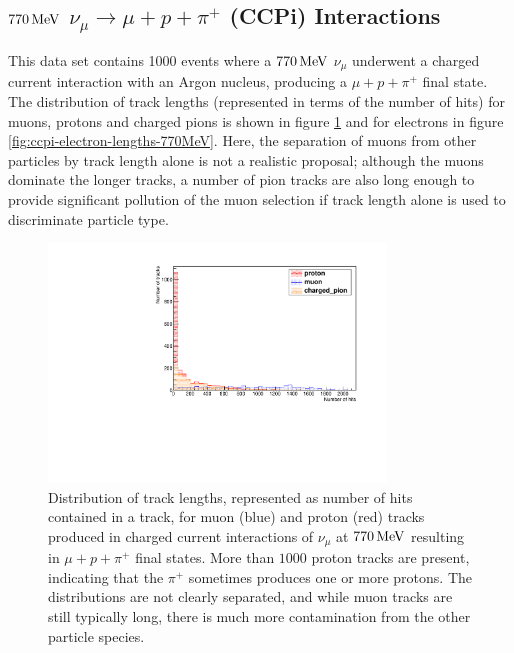 \subsection{$770\MeV$ $\nu_\mu \rightarrow \mu + p + \pi^+$ (CCPi) Interactions}
This data set contains 1000 events where a $770\MeV$ $\nu_\mu$ underwent a charged current interaction with an Argon nucleus, producing a $\mu + p + \pi^+$ final state. The distribution of track lengths (represented in terms of the number of hits) for muons, protons and charged pions is shown in figure \ref{fig:ccpi-track-lengths-770MeV} and for electrons in figure \ref{fig:ccpi-electron-lengths-770MeV}. Here, the separation of muons from other particles by track length alone is not a realistic proposal; although the muons dominate the longer tracks, a number of pion tracks are also long enough to provide significant pollution of the muon selection if track length alone is used to discriminate particle type.

\begin{figure}
\centering
\includegraphics[angle=-90,width=0.8\textwidth]{chapters/particleid_images/ccpi-770-track-lengths}
\caption[Track length distribution for $\mu$, $p$ and $\pi^+$ from $770\MeV$ neutrinos (\acs{CCPi})]{\label{fig:ccpi-track-lengths-770MeV}Distribution of track lengths, represented as number of hits contained in a track, for muon (blue) and proton (red) tracks produced in charged current interactions of $\nu_\mu$ at $770\MeV$ resulting in $\mu + p + \pi^+$ final states. More than $1000$ proton tracks are present, indicating that the $\pi^+$ sometimes produces one or more protons. The distributions are not clearly separated, and while muon tracks are still typically long, there is much more contamination from the other particle species.}
\end{figure}

